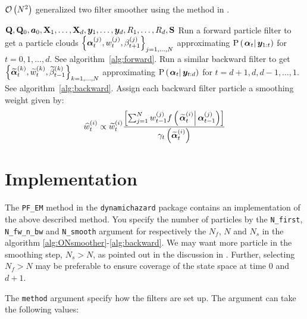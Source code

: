 \begin{algorithm}[H]
\caption{$\mathcal{O}\left( N^2\right)$ generalized two filter smoother using the method in \citet{briers10}.}\label{alg:ON2smoother}
\begin{algorithmic}[1]\raggedright
\INPUT
\Statex $\mathbf{Q},\mathbf{Q}_0,\bm{a}_0,\mathbf{X}_1,\dots,\mathbf{X}_d,\bm{y}_1,\dots,\bm{y}_d,R_1,\dots,R_d,\mathbf{S}$
%
\State Run a forward particle filter to get a particle clouds %
	$\left\{ \bm{\alpha}_{t}^{\left( j\right)}, w_{t}^{\left( j\right)}, \beta_{t + 1}^{\left( j\right)}\right\}_{j=1,\dots,N}$ %
	approximating $\propC{\vec{\alpha}_t}{\vec{y}_{1:t}}$ for $t = 0, 1, \dots, d$. See algorithm~\ref{alg:forward}.
\EndProcedure
%
\State Run a similar backward filter to get %
	$\left\{ \widetilde{\bm{\alpha}}_{t}^{\left( k\right)}, \widetilde{w}_{t}^{\left( k\right)}, \widetilde{\beta}_{t - 1}^{\left( k\right)}\right\}_{k=1,\dots,N}$  %
	approximating $\propC{\vec{\alpha}_t}{\vec{y}_{t:d}}$ for $t = d + 1, d, d-1, \dots, 1$. See algorithm~\ref{alg:backward}.
\EndProcedure
% 
\State Assign each backward filter particle a smoothing weight given by:
\StateXX \begin{equation}\label{eqn:combineWeightO2}
\particS{w}{t}{i} \propto
	\particB{w}{t}{i} \frac{\Lbrac{
		\sum_{j = 1}^N \partic{w}{t - 1}{j}
		\optorC{f}{\particB{\vec{\alpha}}{t}{i}}{\partic{\vec{\alpha}}{t - 1}{j}}
	}}{ \optor{\gamma_t}{\particB{\vec{\alpha}}{t}{i}}}
\end{equation}
\EndFor
\EndProcedure
\end{algorithmic}
\end{algorithm}


\section{Implementation}
The \verb|PF_EM| method in the \verb|dynamichazard| package contains an implementation of the above described method. You specify the number of particles by the \verb|N_first|, \verb|N_fw_n_bw| and \verb|N_smooth| argument for respectively the $N_f$, $N$ and $N_s$ in the algorithm \ref{alg:ONsmoother}-\ref{alg:backward}. We may want more particle in the smoothing step, $N_s > N$, as pointed out in the discussion in \citet[page 460 and 461]{fearnhead10}. Further, selecting $N_f > N$ may be preferable to ensure coverage of the state space at time $0$ and $d + 1$.

The \verb|method| argument specify how the filters are set up. The argument can take the following values:


